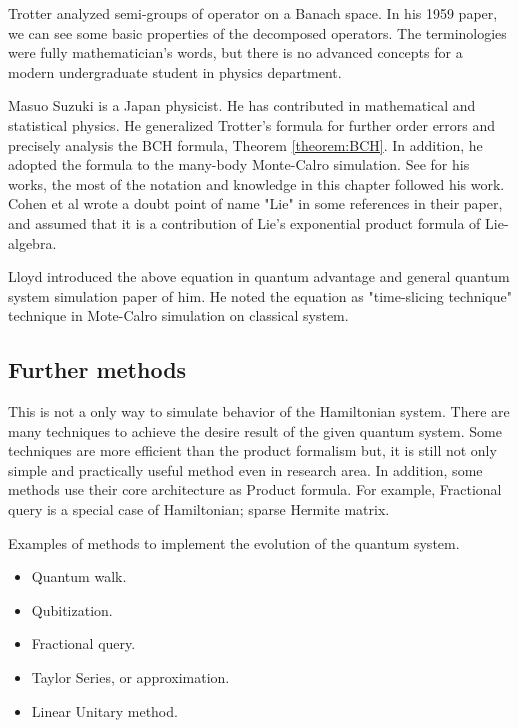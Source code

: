 Trotter analyzed semi-groups of operator on a Banach space\cite{trotter_product_1959}.
In his 1959 paper, we can see some basic properties of the decomposed operators.
The terminologies were fully mathematician's words, but there is no 
advanced concepts for a modern undergraduate student in physics department.

Masuo Suzuki is a Japan physicist. He has contributed in mathematical and statistical physics.
He generalized Trotter's formula for further order errors and precisely analysis the 
BCH formula, Theorem \ref{theorem:BCH}. 
In addition, he adopted the formula to the many-body Monte-Calro simulation. 
See \cite{suzuki_finding_2005} for his works, the most of the notation and knowledge in this chapter 
followed his work.
Cohen et al wrote a doubt point of name "Lie" in some references in their paper\cite{cohen_eigenvalue_1982}, 
and assumed that it is a contribution of Lie's exponential product formula of Lie-algebra.

Lloyd introduced the above equation in quantum advantage and general quantum system 
simulation paper of him\cite{lloyd_universal_1996}. 
He noted the equation as "time-slicing technique" technique in Mote-Calro simulation on classical system.

\subsection{Further methods}

This is not a only way to simulate behavior of the Hamiltonian system. 
There are many techniques to achieve the desire result of the given quantum system.
Some techniques are more efficient than the product formalism but, it is still not only simple and 
practically useful method even in research area. 
In addition, some methods use their core architecture as Product formula.
For example, Fractional query is a special case of Hamiltonian; sparse Hermite matrix.%

Examples of methods to implement the evolution of the quantum system.

\begin{itemize}
    \item Quantum walk.
    \item Qubitization.
    \item Fractional query.
    \item Taylor Series, or approximation.
    \item Linear Unitary method.
\end{itemize}

